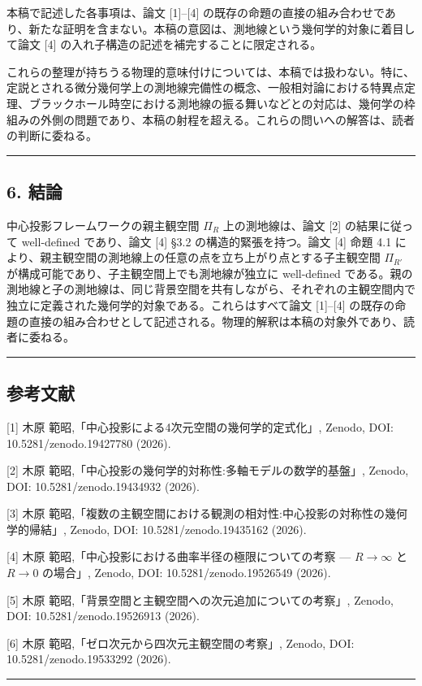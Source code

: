 \documentclass[a4paper,11pt]{ltjsarticle}
\theoremstyle{definition}
\begin{document}
本稿で記述した各事項は、論文 {[}1{]}--{[}4{]} の既存の命題の直接の組み合わせであり、新たな証明を含まない。本稿の意図は、測地線という幾何学的対象に着目して論文 {[}4{]} の入れ子構造の記述を補完することに限定される。

これらの整理が持ちうる物理的意味付けについては、本稿では扱わない。特に、定説とされる微分幾何学上の測地線完備性の概念、一般相対論における特異点定理、ブラックホール時空における測地線の振る舞いなどとの対応は、幾何学の枠組みの外側の問題であり、本稿の射程を超える。これらの問いへの解答は、読者の判断に委ねる。

\begin{center}\rule{0.5\linewidth}{0.5pt}\end{center}

\subsection{6. 結論}\label{ux7d50ux8ad6}

中心投影フレームワークの親主観空間 \(\Pi_R\) 上の測地線は、論文 {[}2{]} の結果に従って well-defined であり、論文 {[}4{]} §3.2 の構造的緊張を持つ。論文 {[}4{]} 命題 4.1 により、親主観空間の測地線上の任意の点を立ち上がり点とする子主観空間 \(\Pi_{R'}\) が構成可能であり、子主観空間上でも測地線が独立に well-defined である。親の測地線と子の測地線は、同じ背景空間を共有しながら、それぞれの主観空間内で独立に定義された幾何学的対象である。これらはすべて論文 {[}1{]}--{[}4{]} の既存の命題の直接の組み合わせとして記述される。物理的解釈は本稿の対象外であり、読者に委ねる。

\begin{center}\rule{0.5\linewidth}{0.5pt}\end{center}

\subsection{参考文献}\label{ux53c2ux8003ux6587ux732e}

{[}1{]} 木原 範昭,「中心投影による4次元空間の幾何学的定式化」, Zenodo, DOI: 10.5281/zenodo.19427780 (2026).

{[}2{]} 木原 範昭,「中心投影の幾何学的対称性:多軸モデルの数学的基盤」, Zenodo, DOI: 10.5281/zenodo.19434932 (2026).

{[}3{]} 木原 範昭,「複数の主観空間における観測の相対性:中心投影の対称性の幾何学的帰結」, Zenodo, DOI: 10.5281/zenodo.19435162 (2026).

{[}4{]} 木原 範昭,「中心投影における曲率半径の極限についての考察 --- \(R \to \infty\) と \(R \to 0\) の場合」, Zenodo, DOI: 10.5281/zenodo.19526549 (2026).

{[}5{]} 木原 範昭,「背景空間と主観空間への次元追加についての考察」, Zenodo, DOI: 10.5281/zenodo.19526913 (2026).

{[}6{]} 木原 範昭,「ゼロ次元から四次元主観空間の考察」, Zenodo, DOI: 10.5281/zenodo.19533292 (2026).

\begin{center}\rule{0.5\linewidth}{0.5pt}\end{center}
\end{document}
